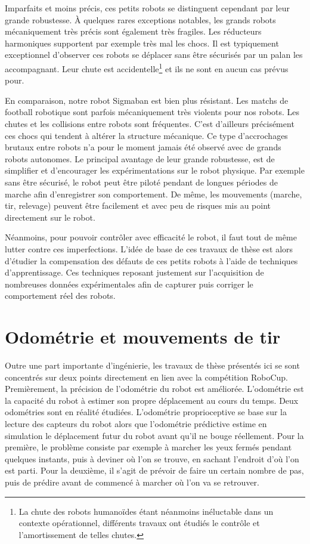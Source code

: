 Imparfaits et moins précis, ces petits robots se distinguent 
cependant par leur grande robustesse.
À quelques rares exceptions notables, les grands robots mécaniquement
très précis sont également très fragiles.
Les réducteurs harmoniques supportent par exemple très mal 
les chocs. 
Il est typiquement exceptionnel d'observer ces robots se déplacer
sans être sécurisés par un palan les accompagnant.
Leur chute est accidentelle\footnote{La chute des robots humanoïdes étant 
néanmoins inéluctable dans un contexte opérationnel, différents travaux 
ont étudiés le contrôle et l'amortissement de telles chutes.} 
et ils ne sont en aucun cas prévus pour.

En comparaison, notre robot Sigmaban est bien plus résistant.
Les matchs de football robotique sont parfois mécaniquement très violents
pour nos robots. Les chutes et les collisions entre robots sont fréquentes.
C'est d'ailleurs précisément ces chocs qui tendent à altérer la 
structure mécanique.
Ce type \og d'accrochages brutaux \fg entre robots n'a pour le moment 
jamais été observé avec de grands robots autonomes.
Le principal avantage de leur grande robustesse, est de simplifier
et d'encourager les expérimentations sur le robot physique.
Par exemple sans être sécurisé, le robot peut être piloté
pendant de longues périodes de marche afin d'enregistrer son comportement.
De même, les mouvements (marche, tir, relevage) peuvent
être facilement et avec peu de risques mis au point directement 
sur le robot.

Néanmoins, pour pouvoir contrôler avec efficacité le robot,
il faut tout de même lutter contre ces imperfections.
L'idée de base de ces travaux de thèse est alors d'étudier la compensation 
des défauts de ces petits robots à l'aide de techniques d'apprentissage.
Ces techniques reposant justement sur l'acquisition de nombreuses données 
expérimentales afin de capturer puis corriger le comportement réel des robots. 

\section{Odométrie et mouvements de tir}

Outre une part importante d'ingénierie, les travaux
de thèse présentés ici se sont concentrés sur deux points 
directement en lien avec la compétition RoboCup.\\

Premièrement, la précision de l'odométrie du robot est améliorée.
L'odométrie est la capacité du robot à estimer son
propre déplacement au cours du temps. Deux odométries sont en réalité étudiées.
L'odométrie proprioceptive se base sur la lecture des capteurs du robot
alors que l'odométrie prédictive estime \og en simulation \fg le
déplacement futur du robot avant qu'il ne bouge réellement.
Pour la première, le problème consiste par exemple à marcher
les yeux fermés pendant quelques instants, puis à deviner 
où l'on se trouve, en sachant l'endroit d'où l'on est parti.
Pour la deuxième, il s'agit de prévoir de faire un certain nombre
de pas, puis de prédire avant de commencé à marcher où l'on va se retrouver.


